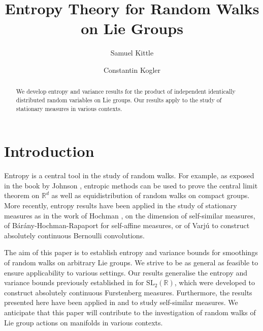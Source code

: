 \documentclass[10pt, english,oneside,reqno]{amsart}
\theoremstyle{plain}
\theoremstyle{remark}
\numberwithin{equation}{section}
\numberwithin{figure}{section}
\newcommand{\R}{\mathbb{R}}
\begin{document}
	\title[Entropy Theory for Random Walks on Lie Groups]{Entropy Theory for Random Walks on Lie Groups}
	\author[sk]{Samuel Kittle}
    \author[ck]{Constantin Kogler}

    \begin{abstract}
        We develop entropy and variance results for the product of independent identically distributed random variables on Lie groups. Our results apply to the study of stationary measures in various contexts.   
    \end{abstract}


    \address{Samuel Kittle, Department of Mathematics, University College London, 25 Gordon Street, London WC1H 0AY, United Kingdom}

    \address{Constantin Kogler, Institute for Advanced Study, 1 Einstein Dr, Princeton, NJ 08540, United States of America}

    \maketitle

    \tableofcontents
	
    \section{Introduction}

    Entropy is a central tool in the study of random walks. For example, as exposed in the book by Johnson \cite{JohnsonInformationBook}, entropic methods can be used to prove the central limit theorem on $\R^d$ as well as equidistribution of random walks on compact groups. More recently, entropy results have been applied in the study of stationary measures as in the work of Hochman \cite{Hochman2014}, \cite{Hochman2017} on the dimension of self-similar measures, of Bárány-Hochman-Rapaport \cite{BaranyHochmanRapaport2019} for self-affine measures, or of Varjú \cite{Varju2019} to construct absolutely continuous Bernoulli convolutions.   
    
    The aim of this paper is to establish entropy and variance bounds for smoothings of random walks on arbitrary Lie groups. We strive to be as general as feasible to ensure applicability to various settings.  Our results generalise the entropy and variance bounds previously established in \cite{Kittle2023} for $\mathrm{SL}_2(\R)$, which were developed to construct absolutely continuous Furstenberg measures. Furthermore, the results presented here have been applied in \cite{KittleKogler2024ACSS} and \cite{KittleKogler2024Dimension} to study self-similar measures. We anticipate that this paper will contribute to the investigation of random walks of Lie group actions on manifolds in various contexts.
    
\end{document}
